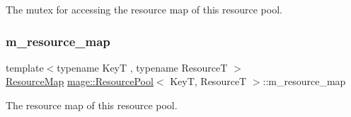 The mutex for accessing the resource map of this resource pool. \hypertarget{classmage_1_1_resource_pool_a5b72496aa427f783a6de90d8ee7ff2a5}{}\label{classmage_1_1_resource_pool_a5b72496aa427f783a6de90d8ee7ff2a5} 
\subsubsection{\texorpdfstring{m\+\_\+resource\+\_\+map}{m\_resource\_map}}
{\footnotesize\ttfamily template$<$typename KeyT , typename ResourceT $>$ \\
\hyperlink{classmage_1_1_resource_pool_a7ae3cfa639bbc3696fa359673fed6153}{Resource\+Map} \hyperlink{classmage_1_1_resource_pool}{mage\+::\+Resource\+Pool}$<$ KeyT, ResourceT $>$\+::m\+\_\+resource\+\_\+map\hspace{0.3cm}{\ttfamily [private]}}

The resource map of this resource pool. 